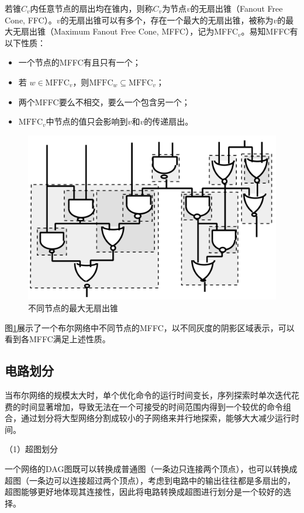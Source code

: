 若锥$C_v$内任意节点的扇出均在锥内，则称$C_v$为节点$v$的无扇出锥（Fanout Free Cone, FFC）。$v$的无扇出锥可以有多个，存在一个最大的无扇出锥，被称为$v$的最大无扇出锥（Maximum Fanout Free Cone, MFFC），记为MFFC$_v$。易知MFFC有以下性质\cite{LS:exact_rewriting,FPGA:Jason_Cong_1993,FPGA:Jason_Cong_patition}：
\begin{itemize}
    \item 一个节点的MFFC有且只有一个；
    \item 若 $w \in \text{MFFC}_v$，则$\text{MFFC}_w \subseteq \text{MFFC}_v$；
    \item 两个MFFC要么不相交，要么一个包含另一个；
    \item $\text{MFFC}_v$中节点的值只会影响到$v$和$v$的传递扇出。
\end{itemize}
\begin{figure}[!htbp]
    \centering
    \includegraphics[width=0.5\linewidth]{./figs/LS-MFFC.png}
    \caption{不同节点的最大无扇出锥}
    \label{LS:MFFC}
\end{figure}
图\ref{LS:MFFC}展示了一个布尔网络中不同节点的MFFC，以不同灰度的阴影区域表示，可以看到各MFFC满足上述性质。


\subsection{电路划分}

当布尔网络的规模太大时，单个优化命令的运行时间变长，序列探索时单次迭代花费的时间显著增加，导致无法在一个可接受的时间范围内得到一个较优的命令组合，通过划分将大型网络分割成较小的子网络来并行地探索，能够大大减少运行时间。

（1）超图划分

一个网络的DAG图既可以转换成普通图（一条边只连接两个顶点），也可以转换成超图（一条边可以连接超过两个顶点），考虑到电路中的输出往往都是多扇出的，超图能够更好地体现其连接性，因此将电路转换成超图进行划分是一个较好的选择\cite{LS:LSOracle}。

